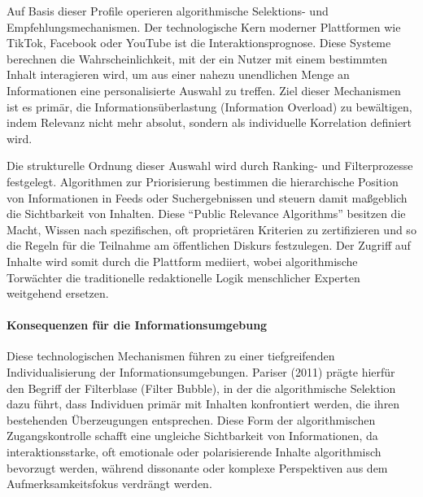 Auf Basis dieser Profile operieren algorithmische Selektions- und Empfehlungsmechanismen. Der technologische Kern moderner Plattformen wie TikTok, Facebook oder YouTube ist die Interaktionsprognose. Diese Systeme berechnen die Wahrscheinlichkeit, mit der ein Nutzer mit einem bestimmten Inhalt interagieren wird, um aus einer nahezu unendlichen Menge an Informationen eine personalisierte Auswahl zu treffen. Ziel dieser Mechanismen ist es primär, die Informationsüberlastung (Information Overload) zu bewältigen, indem Relevanz nicht mehr absolut, sondern als individuelle Korrelation definiert wird.

Die strukturelle Ordnung dieser Auswahl wird durch Ranking- und Filterprozesse festgelegt. Algorithmen zur Priorisierung bestimmen die hierarchische Position von Informationen in Feeds oder Suchergebnissen und steuern damit maßgeblich die Sichtbarkeit von Inhalten. Diese \enquote{Public Relevance Algorithms} besitzen die Macht, Wissen nach spezifischen, oft proprietären Kriterien zu zertifizieren und so die Regeln für die Teilnahme am öffentlichen Diskurs festzulegen. Der Zugriff auf Inhalte wird somit durch die Plattform mediiert, wobei algorithmische Torwächter die traditionelle redaktionelle Logik menschlicher Experten weitgehend ersetzen.

\paragraph{Konsequenzen für die Informationsumgebung}

Diese technologischen Mechanismen führen zu einer tiefgreifenden Individualisierung der Informationsumgebungen. Pariser (2011) prägte hierfür den Begriff der Filterblase (Filter Bubble), in der die algorithmische Selektion dazu führt, dass Individuen primär mit Inhalten konfrontiert werden, die ihren bestehenden Überzeugungen entsprechen. Diese Form der algorithmischen Zugangskontrolle schafft eine ungleiche Sichtbarkeit von Informationen, da interaktionsstarke, oft emotionale oder polarisierende Inhalte algorithmisch bevorzugt werden, während dissonante oder komplexe Perspektiven aus dem Aufmerksamkeitsfokus verdrängt werden.

